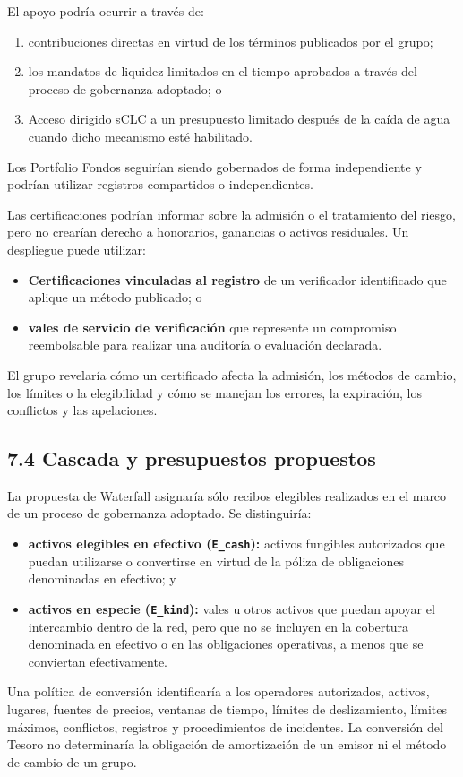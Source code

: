 \documentclass[11pt]{article}
\begin{document}
El apoyo podría ocurrir a través de:

\begin{enumerate}[leftmargin=*]
\item contribuciones directas en virtud de los términos publicados por el grupo;
\item los mandatos de liquidez limitados en el tiempo aprobados a través del proceso de gobernanza adoptado; o
\item Acceso dirigido sCLC a un presupuesto limitado después de la caída de agua cuando dicho mecanismo esté habilitado.
\end{enumerate}
Los Portfolio Fondos seguirían siendo gobernados de forma independiente y podrían utilizar registros compartidos o independientes.

Las certificaciones podrían informar sobre la admisión o el tratamiento del riesgo, pero no crearían derecho a honorarios, ganancias o activos residuales. Un despliegue puede utilizar:

\begin{itemize}[leftmargin=*]
\item \textbf{Certificaciones vinculadas al registro} de un verificador identificado que aplique un método publicado; o
\item \textbf{vales de servicio de verificación} que represente un compromiso reembolsable para realizar una auditoría o evaluación declarada.
\end{itemize}
El grupo revelaría cómo un certificado afecta la admisión, los métodos de cambio, los límites o la elegibilidad y cómo se manejan los errores, la expiración, los conflictos y las apelaciones.

\subsection*{7.4 Cascada y presupuestos propuestos}

La propuesta de Waterfall asignaría sólo recibos elegibles realizados en el marco de un proceso de gobernanza adoptado. Se distinguiría:

\begin{itemize}[leftmargin=*]
\item \textbf{activos elegibles en efectivo (\texttt{E\_cash}):} activos fungibles autorizados que puedan utilizarse o convertirse en virtud de la póliza de obligaciones denominadas en efectivo; y
\item \textbf{activos en especie (\texttt{E\_kind}):} vales u otros activos que puedan apoyar el intercambio dentro de la red, pero que no se incluyen en la cobertura denominada en efectivo o en las obligaciones operativas, a menos que se conviertan efectivamente.
\end{itemize}
Una política de conversión identificaría a los operadores autorizados, activos, lugares, fuentes de precios, ventanas de tiempo, límites de deslizamiento, límites máximos, conflictos, registros y procedimientos de incidentes. La conversión del Tesoro no determinaría la obligación de amortización de un emisor ni el método de cambio de un grupo.
\end{document}
